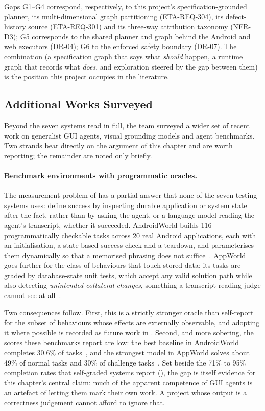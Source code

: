 Gaps G1--G4 correspond, respectively, to this project's specification-grounded
planner, its multi-dimensional graph partitioning (ETA-REQ-304), its
defect-history source (ETA-REQ-301) and its three-way attribution taxonomy
(NFR-D3); G5 corresponds to the shared planner and graph behind the Android and
web executors (DR-04); G6 to the enforced safety boundary (DR-07). The
combination (a specification graph that says what \emph{should} happen, a
runtime graph that records what \emph{does}, and exploration steered by the gap
between them) is the position this project occupies in the literature.

\subsection{Additional Works Surveyed}
\label{subsec:additional}

Beyond the seven systems read in full, the team surveyed a wider set of recent
work on generalist GUI agents, visual grounding models and agent benchmarks.
Two strands bear directly on the argument of this chapter and are worth
reporting; the remainder are noted only briefly.

\paragraph{Benchmark environments with programmatic oracles.} The measurement
problem of  has a partial answer that none of the
seven testing systems uses: define success by inspecting durable application or
system state after the fact, rather than by asking the agent, or a language
model reading the agent's transcript, whether it succeeded. AndroidWorld builds
116 programmatically checkable tasks across 20 real Android applications, each
with an initialisation, a state-based success check and a teardown, and
parameterises them dynamically so that a memorised phrasing does not
suffice~\cite{androidworld}. AppWorld goes further for the class of behaviours
that touch stored data: its tasks are graded by database-state unit tests,
which accept any valid solution path while also detecting \emph{unintended
collateral changes}, something a transcript-reading judge cannot see at
all~\cite{appworld}.

Two consequences follow. First, this is a strictly stronger oracle than
self-report for the subset of behaviours whose effects are externally
observable, and adopting it where possible is recorded as future work in
. Second, and more sobering, the scores these benchmarks
report are low: the best baseline in AndroidWorld completes 30.6\% of
tasks~\cite{androidworld}, and the strongest model in AppWorld solves about
49\% of normal tasks and 30\% of challenge tasks~\cite{appworld}. Set beside
the 71\% to 95\% completion rates that self-graded systems report
(), the gap is itself evidence for this chapter's central
claim: much of the apparent competence of GUI agents is an artefact of letting
them mark their own work. A project whose output is a correctness judgement
cannot afford to ignore that.

